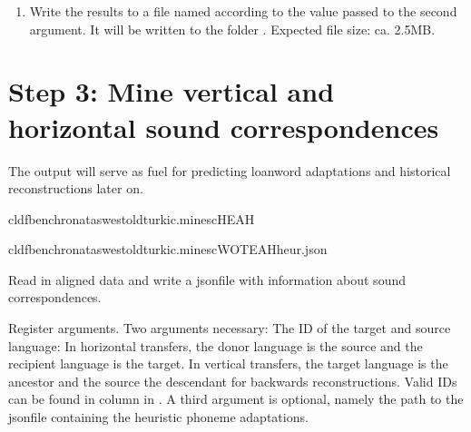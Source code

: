 \documentclass[letterpaper,10pt,english]{sphinxmanual}
\begin{document}
{{{{\begin{fulllineitems}
\begin{enumerate}
\item {} 
\sphinxAtStartPar
Write the results to a file named according to the value passed to the
second argument. It will be written to the folder .
Expected file size: ca. 2.5MB.

\end{enumerate}

\end{fulllineitems}



\section{Step 3: Mine vertical and horizontal sound correspondences}
\label{\detokenize{mkloanpy:step-3-mine-vertical-and-horizontal-sound-correspondences}}
\sphinxAtStartPar
The output will serve as fuel for predicting loanword adaptations and
historical reconstructions later on.

\begin{sphinxVerbatim}[commandchars=\\\{\}]
cldfbenchronataswestoldturkic.minescHEAH
\end{sphinxVerbatim}

\begin{sphinxVerbatim}[commandchars=\\\{\}]
cldfbenchronataswestoldturkic.minescWOTEAHheur.json
\end{sphinxVerbatim}
\label{\detokenize{mkloanpy:module-ronataswestoldturkiccommands.minesc}}
\sphinxAtStartPar
Read in aligned data and write a json\sphinxhyphen{}file with information about sound
correspondences.

\begin{fulllineitems}
\label{\detokenize{mkloanpy:ronataswestoldturkiccommands.minesc.register}}
\pysigstartsignatures
{}
\pysigstopsignatures
\sphinxAtStartPar
Register arguments. Two arguments necessary: The ID of the target and
source language: In horizontal transfers, the donor language is the source
and the recipient language is the target. In vertical transfers, the
target language is the ancestor and the source the descendant for backwards
reconstructions. Valid IDs can be found in
column  in . A third argument is optional,
namely the path to the json\sphinxhyphen{}file containing the heuristic phoneme
adaptations.


\end{fulllineitems}}}}}
\end{document}
